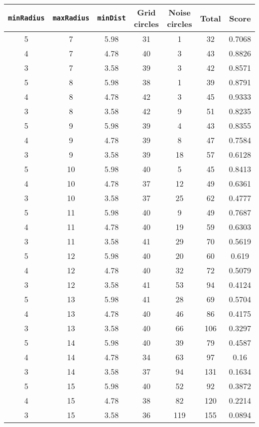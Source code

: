 \documentclass[letterpaper, 12pt]{article}
\begin{document}
\begin{longtable}{|c|c|c|c|c|c|c|}
\hline
\textbf{\texttt{minRadius}} & \textbf{\texttt{maxRadius}} & \textbf{\texttt{minDist}} & \textbf{Grid circles} & \textbf{Noise circles} & \textbf{Total} & \textbf{Score} \\
\hline
5 & 7 & 5.98 & 31 & 1 & 32 & 0.7068 \\
\hline
4 & 7 & 4.78 & 40 & 3 & 43 & 0.8826 \\
\hline
3 & 7 & 3.58 & 39 & 3 & 42 & 0.8571 \\
\hline
5 & 8 & 5.98 & 38 & 1 & 39 & 0.8791 \\
\hline
4 & 8 & 4.78 & 42 & 3 & 45 & 0.9333 \\
\hline
3 & 8 & 3.58 & 42 & 9 & 51 & 0.8235 \\
\hline
5 & 9 & 5.98 & 39 & 4 & 43 & 0.8355 \\
\hline
4 & 9 & 4.78 & 39 & 8 & 47 & 0.7584 \\
\hline
3 & 9 & 3.58 & 39 & 18 & 57 & 0.6128 \\
\hline
5 & 10 & 5.98 & 40 & 5 & 45 & 0.8413 \\
\hline
4 & 10 & 4.78 & 37 & 12 & 49 & 0.6361 \\
\hline
3 & 10 & 3.58 & 37 & 25 & 62 & 0.4777 \\
\hline
5 & 11 & 5.98 & 40 & 9 & 49 & 0.7687 \\
\hline
4 & 11 & 4.78 & 40 & 19 & 59 & 0.6303 \\
\hline
3 & 11 & 3.58 & 41 & 29 & 70 & 0.5619 \\
\hline
5 & 12 & 5.98 & 40 & 20 & 60 & 0.619 \\
\hline
4 & 12 & 4.78 & 40 & 32 & 72 & 0.5079 \\
\hline
3 & 12 & 3.58 & 41 & 53 & 94 & 0.4124 \\
\hline
5 & 13 & 5.98 & 41 & 28 & 69 & 0.5704 \\
\hline
4 & 13 & 4.78 & 40 & 46 & 86 & 0.4175 \\
\hline
3 & 13 & 3.58 & 40 & 66 & 106 & 0.3297 \\
\hline
5 & 14 & 5.98 & 40 & 39 & 79 & 0.4587 \\
\hline
4 & 14 & 4.78 & 34 & 63 & 97 & 0.16 \\
\hline
3 & 14 & 3.58 & 37 & 94 & 131 & 0.1634 \\
\hline
5 & 15 & 5.98 & 40 & 52 & 92 & 0.3872 \\
\hline
4 & 15 & 4.78 & 38 & 82 & 120 & 0.2214 \\
\hline
3 & 15 & 3.58 & 36 & 119 & 155 & 0.0894 \\

\end{longtable}
\end{document}
